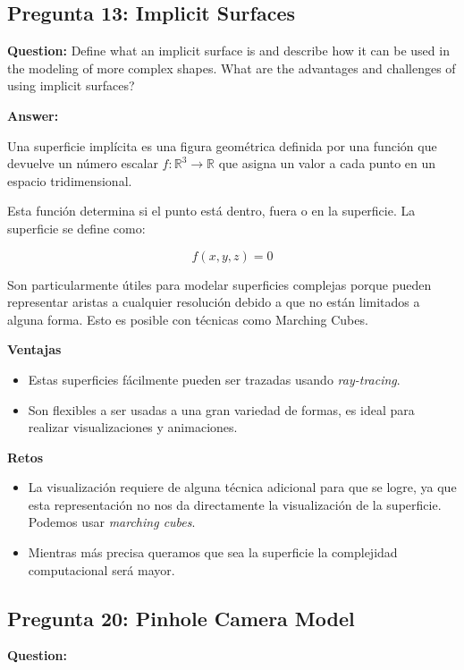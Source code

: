 \documentclass{article}
\begin{document}
\subsection{Pregunta 13: Implicit Surfaces}

\textbf{Question:} Define what an implicit surface is and describe how it can be used in the modeling of more complex shapes. What are the advantages and challenges of using implicit surfaces?

\textbf{Answer:}

Una superficie implícita es una figura geométrica definida por una función que devuelve un número escalar $f: \mathbb{R}^3 \rightarrow \mathbb{R}$ que asigna un valor a cada punto en un espacio tridimensional.

Esta función determina si el punto está dentro, fuera o en la superficie. La superficie se define como:

\[
f(x,y,z)=0
\]

Son particularmente útiles para modelar superficies complejas porque pueden representar aristas a cualquier resolución debido a que no están limitados a alguna forma. Esto es posible con técnicas como Marching Cubes.

\textbf{Ventajas}

\begin{itemize}
    \item Estas superficies fácilmente pueden ser trazadas usando \textit{ray-tracing}.
    \item Son flexibles a ser usadas a una gran variedad de formas, es ideal para realizar visualizaciones y animaciones.
\end{itemize}

\textbf{Retos}

\begin{itemize}
    \item La visualización requiere de alguna técnica adicional para que se logre, ya que esta representación no nos da directamente la visualización de la superficie. Podemos usar \textit{marching cubes}.
    \item Mientras más precisa queramos que sea la superficie la complejidad computacional será mayor.
\end{itemize}

\subsection{Pregunta 20: Pinhole Camera Model}

\textbf{Question:} 
\end{document}
